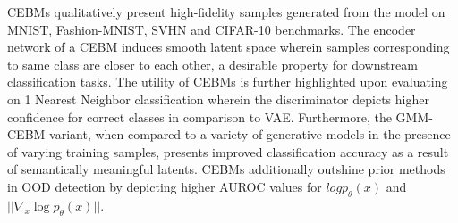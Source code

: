 \documentclass[12pt,letterpaper]{article}
\begin{document}
CEBMs qualitatively present high-fidelity samples generated from the model on MNIST, Fashion-MNIST, SVHN and CIFAR-10 benchmarks. The encoder network of a CEBM induces smooth latent space wherein samples corresponding to same class are closer to each other, a desirable property for downstream classification tasks. The utility of CEBMs is further highlighted upon evaluating on 1 Nearest Neighbor classification wherein the discriminator depicts higher confidence for correct classes in comparison to VAE. Furthermore, the GMM-CEBM variant, when compared to a variety of generative models in the presence of varying training samples, presents improved classification accuracy as a result of semantically meaningful latents. CEBMs additionally outshine prior methods in OOD detection by depicting higher AUROC values for $log p_{\theta}(x)$ and $||\nabla_{x}\log p_{\theta}(x)||$. 
\end{document}

